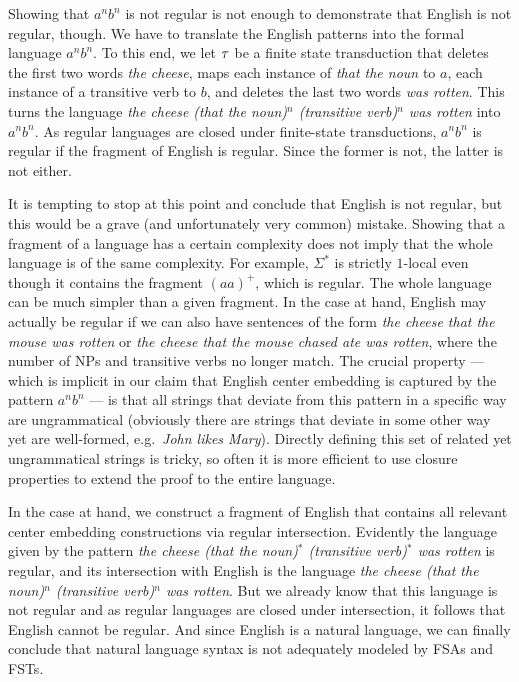 Showing that $a^n b^n$ is not regular is not enough to demonstrate that English is not regular, though.
We have to translate the English patterns into the formal language $a^n b^n$.
To this end, we let $\tau$ be a finite state transduction that deletes the first two words \emph{the cheese}, maps each instance of \emph{that the noun} to $a$, each instance of a transitive verb to $b$, and deletes the last two words \emph{was rotten}.
This turns the language \emph{the cheese (that the noun)$^n$ (transitive verb)$^n$ was rotten} into $a^n b^n$.
As regular languages are closed under finite-state transductions, $a^n b^n$ is regular if the fragment of English is regular.
Since the former is not, the latter is not either.

It is tempting to stop at this point and conclude that English is not regular, but this would be a grave (and unfortunately very common) mistake.
Showing that a fragment of a language has a certain complexity does not imply that the whole language is of the same complexity.
For example, $\Sigma^*$ is strictly $1$-local even though it contains the fragment $(aa)^+$, which is regular.
The whole language can be much simpler than a given fragment. 
In the case at hand, English may actually be regular if we can also have sentences of the form \emph{the cheese that the mouse was rotten} or \emph{the cheese that the mouse chased ate was rotten}, where the number of NPs and transitive verbs no longer match.
The crucial property --- which is implicit in our claim that English center embedding is captured by the pattern $a^n b^n$ --- is that all strings that deviate from this pattern in a specific way are ungrammatical (obviously there are strings that deviate in some other way yet are well-formed, e.g.\ \emph{John likes Mary}).
Directly defining this set of related yet ungrammatical strings is tricky, so often it is more efficient to use closure properties to extend the proof to the entire language.

In the case at hand, we construct a fragment of English that contains all relevant center embedding constructions via regular intersection.
Evidently the language given by the pattern \emph{the cheese (that the noun)$^*$ (transitive verb)$^*$ was rotten} is regular, and its intersection with English is the language \emph{the cheese (that the noun)$^n$ (transitive verb)$^n$ was rotten}.
But we already know that this language is not regular and as regular languages are closed under intersection, it follows that English cannot be regular.
And since English is a natural language, we can finally conclude that natural language syntax is not adequately modeled by FSAs and FSTs.

